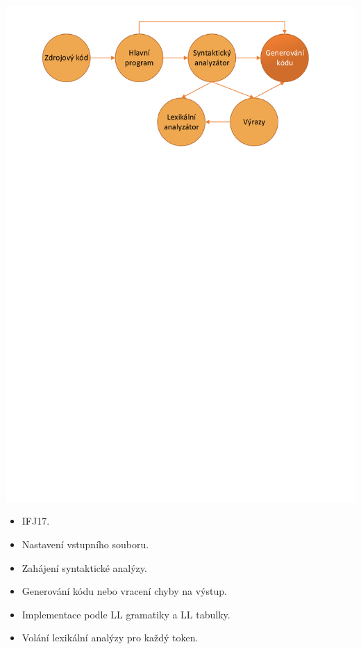 \documentclass[11pt, hyperref={unicode}]{beamer}
\begin{document}
\begin{frame}
\begin{overprint}
 	\centerline{\includegraphics[width=0.95\linewidth]{img/generovani_kodu.pdf}}%
\end{overprint}
\vspace{-10cm}
\begin{overprint}
  	\begin{itemize}
		\item IFJ17.
	\end{itemize}
  	\begin{itemize}
		\item Nastavení vstupního souboru.
		\item Zahájení syntaktické analýzy.
		\item Generování kódu nebo vracení chyby na výstup.
	\end{itemize}
  	\begin{itemize}
  		\item Implementace podle LL gramatiky a LL tabulky.
		\item Volání lexikální analýzy pro každý token.

\end{itemize}
\end{overprint}
\end{frame}
\end{document}
